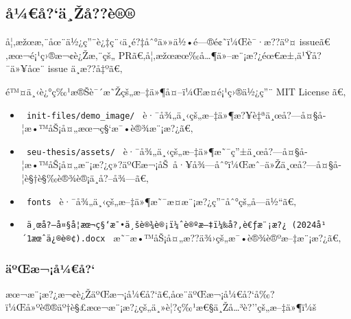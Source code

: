 \subsection{å¼€å?{}`ä¸Žå??è®®}\label{uxe5uxbcuxe5uxe4ux17euxe5uxe8}

å¦‚æžœæ‚¨åœ¨ä½¿ç''¨è¿‡ç¨‹ä¸­é?‡åˆ°ä»»ä½•é---®é¢˜ï¼Œè¯·æ??äº¤
issueã€‚æœ¬é¡¹ç›®æ¬¢è¿Žæ‚¨çš„
PRã€‚å¦‚æžœæœ‰å\ldots¶ä»--æ¨¡æ?¿éœ€æ±‚ä¹Ÿå?¯ä»¥åœ¨ issue ä¸­æ??å‡ºã€‚

é™¤ä¸‹è¿°ç‰¹æ®Šè¯´æ˜Žçš„æ--‡ä»¶å¤--ï¼Œæ­¤é¡¹ç›®ä½¿ç''¨ MIT License ã€‚

\begin{itemize}
\tightlist
\item
  \texttt{\ init-files/demo\_image/\ }
  è·¯å¾„ä¸‹çš„æ--‡ä»¶æ?¥è‡ªä¸œå?---å¤§å­¦æ•™åŠ¡å¤„æœ¬ç§`æ¯•è®¾æ¨¡æ?¿ã€‚
\item
  \texttt{\ seu-thesis/assets/\ }
  è·¯å¾„ä¸‹çš„æ--‡ä»¶æ˜¯ç''±ä¸œå?---å¤§å­¦æ•™åŠ¡å¤„æ¨¡æ?¿ç»?äºŒæ¬¡åŠ~å·¥å¾---åˆ°ï¼Œæˆ--ä»Žä¸œå?---å¤§å­¦è§†è§‰è®¾è®¡ä¸­å?--å¾---ã€‚
\item
  \texttt{\ fonts\ } è·¯å¾„ä¸‹çš„æ--‡ä»¶æ˜¯æ­¤æ¨¡æ?¿ç''¨åˆ°çš„å­---ä½``ã€‚
\item
  \texttt{\ ä¸œå?—å¤§å­¦æœ¬ç§‘æ¯•ä¸šè®¾è®¡ï¼ˆè®ºæ–‡ï¼‰å?‚è€ƒæ¨¡æ?¿\ (2024å¹´1æœˆä¿®è®¢).docx\ }
  æ˜¯æ•™åŠ¡å¤„æ??ä¾›çš„æ¯•è®¾è®ºæ--‡æ¨¡æ?¿ã€‚
\end{itemize}

\subsubsection{äºŒæ¬¡å¼€å?{}`}\label{uxe4uxbaux153uxe6uxe5uxbcuxe5}

æœ¬æ¨¡æ?¿æ¬¢è¿ŽäºŒæ¬¡å¼€å?{}`ã€‚åœ¨äºŒæ¬¡å¼€å?{}`å‰?ï¼Œå»ºè®®äº†è§£æœ¬æ¨¡æ?¿çš„ä¸»è¦?ç‰¹æ€§ä¸Žå\ldots³è?''çš„æ--‡ä»¶ï¼š

